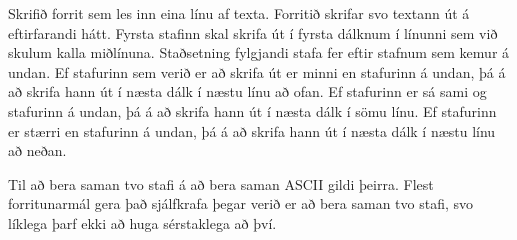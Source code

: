 \begin{problem}
	Skrifið forrit sem les inn eina línu af texta. Forritið skrifar svo textann út á eftirfarandi hátt. Fyrsta stafinn skal skrifa út í fyrsta dálknum í línunni sem við skulum kalla miðlínuna. Staðsetning fylgjandi stafa fer eftir stafnum sem kemur á undan. Ef stafurinn sem verið er að skrifa út er minni en stafurinn á undan, þá á að skrifa hann út í næsta dálk í næstu línu að ofan. Ef stafurinn er sá sami og stafurinn á undan, þá á að skrifa hann út í næsta dálk í sömu línu. Ef stafurinn er stærri en stafurinn á undan, þá á að skrifa hann út í næsta dálk í næstu línu að neðan.

	Til að bera saman tvo stafi á að bera saman ASCII gildi þeirra. Flest forritunarmál gera það sjálfkrafa þegar verið er að bera saman tvo stafi, svo líklega þarf ekki að huga sérstaklega að því.

\begin{example}
%
\end{example}

\begin{example}
%
\end{example}
\end{problem}